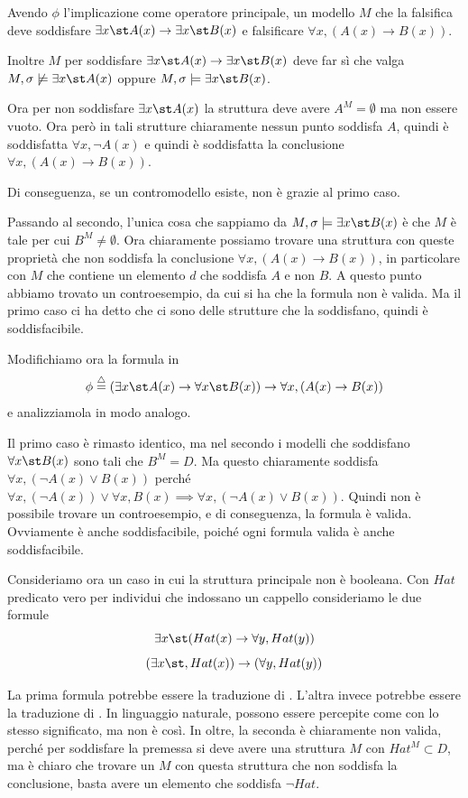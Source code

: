 Avendo \(\phi\) l'implicazione come operatore principale, un modello \(M\) che la falsifica deve soddisfare \(\exists x\st A(x)\to \exists x\st B(x)\) e falsificare \(\forall x, (A(x)\to B(x))\).

Inoltre \(M\) per soddisfare \(\exists x\st A(x)\to \exists x\st B(x)\) deve far sì che valga \(M,\sigma\not\models \exists x\st A(x)\) oppure \(M,\sigma \models \exists x\st B(x)\). 

Ora per non soddisfare \(\exists x\st A(x)\) la struttura deve avere \(A^M =\emptyset\) ma non essere vuoto. Ora però in tali strutture chiaramente nessun punto soddisfa \(A\), quindi è soddisfatta \(\forall x, \neg A(x)\) e quindi è soddisfatta la conclusione \(\forall x, (A(x)\to B(x))\). 

Di conseguenza, se un contromodello esiste, non è grazie al primo caso.

Passando al secondo, l'unica cosa che sappiamo da \(M,\sigma\models \exists x\st B(x)\) è che \(M\) è tale per cui \(B^M \neq \emptyset\). Ora chiaramente possiamo trovare una struttura con queste proprietà che non soddisfa la conclusione \(\forall x, (A(x)\to B(x))\), in particolare con \(M\) che contiene un elemento \(d\) che soddisfa \(A\) e non \(B\). A questo punto abbiamo trovato un controesempio, da cui si ha che la formula non è valida. Ma il primo caso ci ha detto che ci sono delle strutture che la soddisfano, quindi è soddisfacibile.

Modifichiamo ora la formula in 
\[\phi \eqdef (\exists x\st A(x)\to \forall x\st B(x))\to \forall x, (A(x)\to B(x))\]
e analizziamola in modo analogo.

Il primo caso è rimasto identico, ma nel secondo i modelli che soddisfano \(\forall x\st B(x)\) sono tali che \(B^M = D\). Ma questo chiaramente soddisfa \(\forall x, (\neg A(x)\lor B(x))\) perché \(\forall x, (\neg A(x)) \lor \forall x, B(x) \implies \forall x, (\neg A(x)\lor B(x))\). Quindi non è possibile trovare un controesempio, e di conseguenza, la formula è valida. Ovviamente è anche soddisfacibile, poiché ogni formula valida è anche soddisfacibile.

Consideriamo ora un caso in cui la struttura principale non è booleana.
Con \(Hat\) predicato vero per individui che indossano un cappello consideriamo le due formule
\[\exists x\st (Hat(x) \to \forall y, Hat(y))\]
\[(\exists x\st, Hat(x))\to(\forall y, Hat(y))\]

La prima formula potrebbe essere la traduzione di . L'altra invece potrebbe essere la traduzione di . In linguaggio naturale, possono essere percepite come con lo stesso significato, ma non è così. In oltre, la seconda è chiaramente non valida, perché per soddisfare la premessa si deve avere una struttura \(M\) con \(Hat^M\subset D\), ma è chiaro che trovare un \(M\) con questa struttura che non soddisfa la conclusione, basta avere un elemento che soddisfa \(\neg Hat\).

